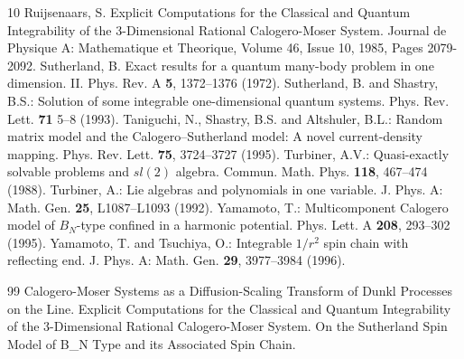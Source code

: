 \documentclass[12pt]{article}
\begin{document}

\begin{thebibliography}{10}
     Ruijsenaars, S. Explicit Computations for the Classical and Quantum Integrability of the 3-Dimensional Rational Calogero-Moser System. Journal de Physique A: Mathematique et Theorique, Volume 46, Issue 10, 1985, Pages 2079-2092.
     Sutherland, B. Exact results for a quantum many-body problem in one dimension. II. Phys. Rev. A {\bf 5}, 1372--1376 (1972).
     Sutherland, B. and Shastry, B.S.: Solution of some integrable one-dimensional quantum systems. Phys. Rev. Lett. {\bf 71} 5--8 (1993).
     Taniguchi, N., Shastry, B.S. and Altshuler, B.L.: Random matrix model and the Calogero--Sutherland model: A novel current-density mapping. Phys. Rev. Lett. {\bf 75}, 3724--3727 (1995).
     Turbiner, A.V.: Quasi-exactly solvable problems and $sl(2)$ algebra. Commun. Math. Phys. {\bf 118}, 467--474 (1988).
     Turbiner, A.: Lie algebras and polynomials in one variable. J. Phys. A: Math. Gen. {\bf 25}, L1087--L1093 (1992).
     Yamamoto, T.: Multicomponent Calogero model of $B_N$-type confined in a harmonic potential. Phys. Lett. A {\bf 208}, 293--302 (1995).
     Yamamoto, T. and Tsuchiya, O.: Integrable $1/r^2$ spin chain with reflecting end. J. Phys. A: Math. Gen. {\bf 29}, 3977--3984 (1996).
\end{thebibliography}                                                                                                                                                                                                              
                
\begin{thebibliography}{99}                                                                                                                                                                                    
 Calogero-Moser Systems as a Diffusion-Scaling Transform of Dunkl Processes on the Line.
 Explicit Computations for the Classical and Quantum Integrability of the 3-Dimensional Rational Calogero-Moser System.
 On the Sutherland Spin Model of B_N Type and its Associated Spin Chain.     
\end{thebibliography}                                                                                                                                                                                            
                                                                                                                                                                                                                    
\end{document}
